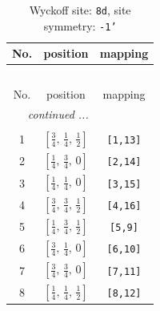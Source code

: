 \documentclass[fleqn,8pt]{jsarticle}
\begin{document}
\begin{longtable}{ccc}
\caption{Wyckoff site: {\tt 8d}, site symmetry: {\tt -1'}}
 \\
 \hline \hline
No. & position & mapping \\ \hline \endfirsthead

\multicolumn{2}{l}{\tablename\ \thetable{}} \\
 \hline \hline
No. & position & mapping \\ \hline \endhead

 \hline \hline
\multicolumn{2}{r}{\footnotesize\it continued ...} \\ \endfoot

 \hline \hline
\multicolumn{2}{r}{} \\ \endlastfoot

1 & $\left[ \frac{3}{4},\, \frac{1}{4},\, \frac{1}{2} \right]$ & {\tt [1,13]} \\ \hline
2 & $\left[ \frac{1}{4},\, \frac{3}{4},\, 0 \right]$ & {\tt [2,14]} \\ \hline
3 & $\left[ \frac{1}{4},\, \frac{1}{4},\, 0 \right]$ & {\tt [3,15]} \\ \hline
4 & $\left[ \frac{3}{4},\, \frac{3}{4},\, \frac{1}{2} \right]$ & {\tt [4,16]} \\ \hline
5 & $\left[ \frac{1}{4},\, \frac{3}{4},\, \frac{1}{2} \right]$ & {\tt [5,9]} \\ \hline
6 & $\left[ \frac{3}{4},\, \frac{1}{4},\, 0 \right]$ & {\tt [6,10]} \\ \hline
7 & $\left[ \frac{3}{4},\, \frac{3}{4},\, 0 \right]$ & {\tt [7,11]} \\ \hline
8 & $\left[ \frac{1}{4},\, \frac{1}{4},\, \frac{1}{2} \right]$ & {\tt [8,12]} \\
\end{longtable}
\renewcommand{\arraystretch}{1.2}
\end{document}
